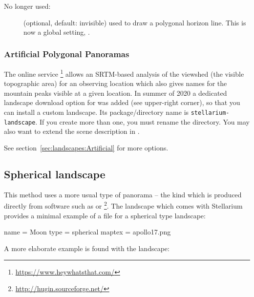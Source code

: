 No longer used:
\begin{description}
\item[] (optional, default: invisible) used
  to draw a polygonal horizon line. 
  This is now a global setting, .
\end{description}

\subsubsection{Artificial Polygonal Panoramas}
\label{sec:landscapes:Polygonal:Artificial}

The online service
\footnote{\url{https://www.heywhatsthat.com/}}
allows an SRTM-based analysis of the viewshed (the visible topographic
area) for an observing location which also gives names for the
mountain peaks visible at a given location. In summer of 2020 a
dedicated landscape download option for  was added
(see upper-right corner), so that you can install a custom
landscape. Its package/directory name is
\texttt{stellarium-landscape}. If you create more than one, you must
rename the directory. You may also want to extend the scene
description in .

See section~\ref{sec:landscapes:Artificial} for more options.

\subsection{Spherical landscape}
\label{sec:landscapes:Spherical}

This method uses a more usual type of panorama -- the kind which is
produced directly from software such as  or
\footnote{\url{http://hugin.sourceforge.net/}}.  The
 landscape which comes with Stellarium provides a
minimal example of a  file for a spherical type
landscape:

\begin{configfile}
[landscape]
name = Moon
type = spherical
maptex = apollo17.png
\end{configfile}
A more elaborate example is found with the  landscape:

